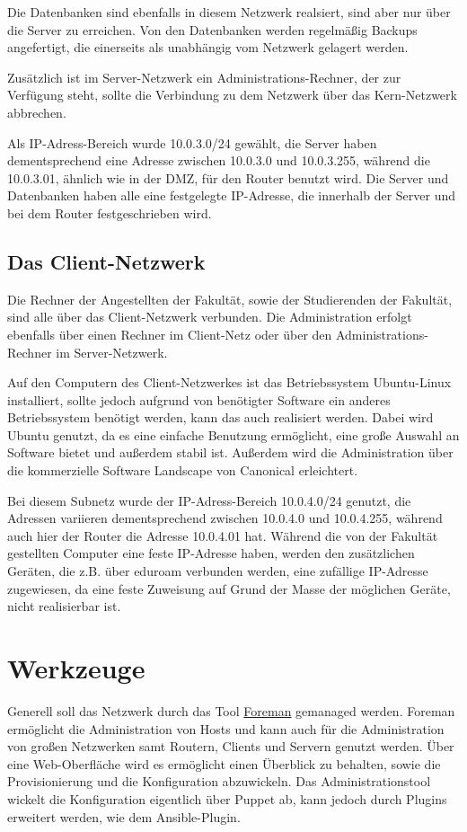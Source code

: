 Die Datenbanken sind ebenfalls in diesem Netzwerk realsiert, sind aber nur über die Server zu erreichen. Von den Datenbanken werden regelmäßig Backups angefertigt, die einerseits als unabhängig vom Netzwerk gelagert werden.

Zusätzlich ist im Server-Netzwerk ein Administrations-Rechner, der zur Verfügung steht, sollte die Verbindung zu dem Netzwerk über das Kern-Netzwerk abbrechen.

Als IP-Adress-Bereich wurde 10.0.3.0/24 gewählt, die Server haben dementsprechend eine Adresse zwischen 10.0.3.0 und 10.0.3.255, während die 10.0.3.01, ähnlich wie in der DMZ, für den Router benutzt wird. Die Server und Datenbanken haben alle eine festgelegte IP-Adresse, die innerhalb der Server und bei dem Router festgeschrieben wird.

\subsection{Das Client-Netzwerk}
Die Rechner der Angestellten der Fakultät, sowie der Studierenden der Fakultät, sind alle über das Client-Netzwerk verbunden. Die Administration erfolgt ebenfalls über einen Rechner im Client-Netz oder über den Administrations-Rechner im Server-Netzwerk.

Auf den Computern des Client-Netzwerkes ist das Betriebssystem Ubuntu-Linux installiert, sollte jedoch aufgrund von benötigter Software ein anderes Betriebssystem benötigt werden, kann das auch realisiert werden. Dabei wird Ubuntu genutzt, da es eine einfache Benutzung ermöglicht, eine große Auswahl an Software bietet und außerdem stabil ist. Außerdem wird die Administration über die kommerzielle Software Landscape von Canonical erleichtert.

Bei diesem Subnetz wurde der IP-Adress-Bereich 10.0.4.0/24 genutzt, die Adressen variieren dementsprechend zwischen 10.0.4.0 und 10.0.4.255, während auch hier der Router die Adresse 10.0.4.01 hat. Während die von der Fakultät gestellten Computer eine feste IP-Adresse haben, werden den zusätzlichen Geräten, die z.B. über eduroam verbunden werden, eine zufällige IP-Adresse zugewiesen, da eine feste Zuweisung auf Grund der Masse der möglichen Geräte, nicht realisierbar ist.

\section{Werkzeuge}
Generell soll das Netzwerk durch das Tool \href{www.theforeman.org}{Foreman} gemanaged werden. Foreman ermöglicht die Administration von Hosts und kann auch für die Administration von großen Netzwerken samt Routern, Clients und Servern genutzt werden. Über eine Web-Oberfläche wird es ermöglicht einen Überblick zu behalten, sowie die Provisionierung und die Konfiguration abzuwickeln.
Das Administrationstool wickelt die Konfiguration eigentlich über Puppet ab, kann jedoch durch Plugins erweitert werden, wie dem Ansible-Plugin. 

